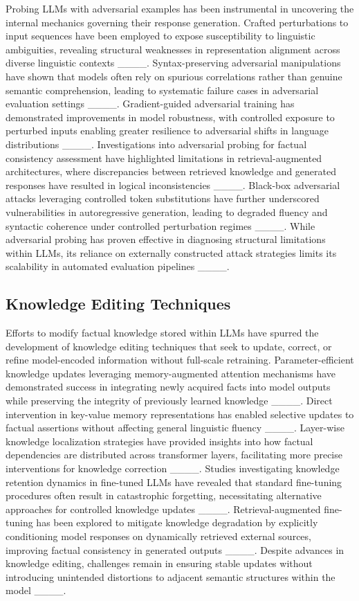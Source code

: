 Probing LLMs with adversarial examples has been instrumental in uncovering the internal mechanics governing their response generation. Crafted perturbations to input sequences have been employed to expose susceptibility to linguistic ambiguities, revealing structural weaknesses in representation alignment across diverse linguistic contexts ____. Syntax-preserving adversarial manipulations have shown that models often rely on spurious correlations rather than genuine semantic comprehension, leading to systematic failure cases in adversarial evaluation settings ____. Gradient-guided adversarial training has demonstrated improvements in model robustness, with controlled exposure to perturbed inputs enabling greater resilience to adversarial shifts in language distributions ____. Investigations into adversarial probing for factual consistency assessment have highlighted limitations in retrieval-augmented architectures, where discrepancies between retrieved knowledge and generated responses have resulted in logical inconsistencies ____. Black-box adversarial attacks leveraging controlled token substitutions have further underscored vulnerabilities in autoregressive generation, leading to degraded fluency and syntactic coherence under controlled perturbation regimes ____. While adversarial probing has proven effective in diagnosing structural limitations within LLMs, its reliance on externally constructed attack strategies limits its scalability in automated evaluation pipelines ____.

\subsection{Knowledge Editing Techniques}

Efforts to modify factual knowledge stored within LLMs have spurred the development of knowledge editing techniques that seek to update, correct, or refine model-encoded information without full-scale retraining. Parameter-efficient knowledge updates leveraging memory-augmented attention mechanisms have demonstrated success in integrating newly acquired facts into model outputs while preserving the integrity of previously learned knowledge ____. Direct intervention in key-value memory representations has enabled selective updates to factual assertions without affecting general linguistic fluency ____. Layer-wise knowledge localization strategies have provided insights into how factual dependencies are distributed across transformer layers, facilitating more precise interventions for knowledge correction ____. Studies investigating knowledge retention dynamics in fine-tuned LLMs have revealed that standard fine-tuning procedures often result in catastrophic forgetting, necessitating alternative approaches for controlled knowledge updates ____. Retrieval-augmented fine-tuning has been explored to mitigate knowledge degradation by explicitly conditioning model responses on dynamically retrieved external sources, improving factual consistency in generated outputs ____. Despite advances in knowledge editing, challenges remain in ensuring stable updates without introducing unintended distortions to adjacent semantic structures within the model ____.

